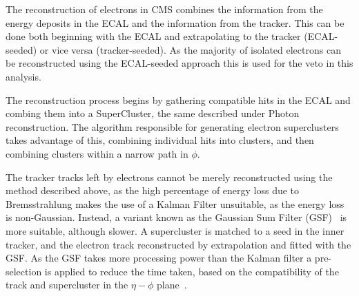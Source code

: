 The reconstruction of electrons in CMS combines the information from the energy deposits in the ECAL and the information from the tracker. This can be done both beginning with the ECAL and extrapolating to the tracker (ECAL-seeded) or vice versa (tracker-seeded). As the majority of isolated electrons can be reconstructed using the ECAL-seeded approach this is used for the veto in this analysis. 

The reconstruction process begins by gathering compatible hits in the ECAL and combing them into a SuperCluster, the same described under Photon reconstruction. The algorithm responsible for generating electron superclusters takes advantage of this, combining individual hits into clusters, and then combining clusters within a narrow path in $\phi$. 

The tracker tracks left by electrons cannot be merely reconstructed using the method described above, as the high percentage of energy loss due to Bremsstrahlung makes the use of a Kalman Filter unsuitable, as the energy loss is non-Gaussian.  Instead, a variant known as the Gaussian Sum Filter (GSF)~\cite{gsf} is more suitable, although slower. A supercluster is matched to a seed in the inner tracker, and the electron track reconstructed by extrapolation and fitted with the GSF.  As the GSF takes more processing power than the Kalman filter a pre-selection is applied to reduce the time taken, based on the compatibility of the track and supercluster in the $\eta - \phi$ plane~\cite{EGM-10-004}.



